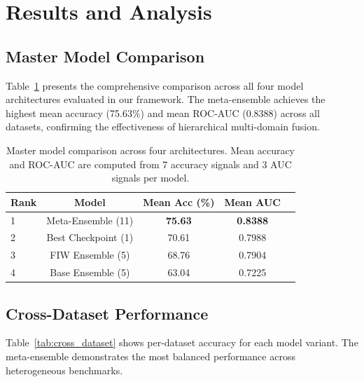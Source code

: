 \documentclass[journal,12pt]{IEEEtran}
\begin{document}
\section{Results and Analysis}
\label{sec:results}

\subsection{Master Model Comparison}
\label{sec:master_comparison}

Table~\ref{tab:master_comparison} presents the comprehensive comparison
across all four model architectures evaluated in our framework. The
meta-ensemble achieves the highest mean accuracy (75.63\%) and mean
ROC-AUC (0.8388) across all datasets, confirming the effectiveness of
hierarchical multi-domain fusion.

\begin{table}[t]
    \centering
    \caption{Master model comparison across four architectures. Mean
    accuracy and ROC-AUC are computed from 7 accuracy signals and 3 AUC
    signals per model.}
    \label{tab:master_comparison}
    \begin{tabular}{lcccc}
        \toprule
        \textbf{Rank} & \textbf{Model} & \textbf{Mean Acc (\%)} & \textbf{Mean AUC} \\
        \midrule
        1 & Meta-Ensemble (11) & \textbf{75.63} & \textbf{0.8388} \\
        2 & Best Checkpoint (1) & 70.61 & 0.7988 \\
        3 & FIW Ensemble (5) & 68.76 & 0.7904 \\
        4 & Base Ensemble (5) & 63.04 & 0.7225 \\
        \bottomrule
    \end{tabular}
\end{table}

\subsection{Cross-Dataset Performance}
\label{sec:cross_dataset}

Table~\ref{tab:cross_dataset} shows per-dataset accuracy for each model
variant. The meta-ensemble demonstrates the most balanced performance
across heterogeneous benchmarks.
\end{document}
